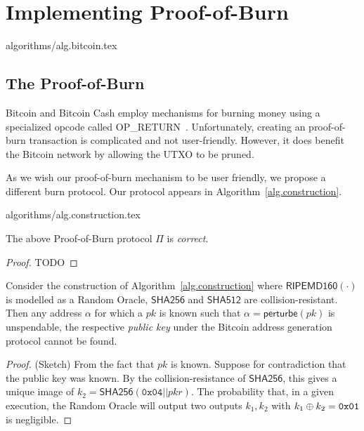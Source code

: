 \section{Implementing Proof-of-Burn}\label{section:construction}

{algorithms/alg.bitcoin.tex}


\subsection{The Proof-of-Burn}
Bitcoin and Bitcoin Cash employ mechanisms for burning money using a specialized
opcode called \textsf{OP\_RETURN}~\cite{bartoletti2017analysis}. Unfortunately,
creating an  proof-of-burn transaction is complicated and not
user-friendly. However, it does benefit the Bitcoin network by allowing the UTXO
to be pruned.

As we wish our proof-of-burn mechanism to be user friendly, we propose a
different burn protocol. Our protocol appears in
Algorithm~\ref{alg.construction}.

{algorithms/alg.construction.tex}

\begin{theorem}[Correctness]
  The above Proof-of-Burn protocol $\Pi$ is \emph{correct}.
\end{theorem}
\begin{proof}
  TODO
\end{proof}

\begin{lemma}[Unspendability]
  Consider the construction of Algorithm~\ref{alg.construction} where
  $\textsf{RIPEMD160}(\cdot)$ is modelled as a Random Oracle, $\textsf{SHA256}$
  and $\textsf{SHA512}$  are collision-resistant. Then any address $\alpha$ for
  which a $pk$ is known such that $\alpha = \textsf{perturbe}(pk)$ is
  unspendable, the respective \emph{public key} under the Bitcoin address
  generation protocol cannot be found.
\end{lemma}
\begin{proof}(Sketch)
  From the fact that $pk$ is known.
  Suppose for contradiction that the public key was known.
  By the collision-resistance of $\textsf{SHA256}$, this gives a unique image of
  $k_2 = \textsf{SHA256}(\texttt{0x04} || pkr)$.
  The probability that, in a given execution, the Random Oracle will output two
  outputs $k_1, k_2$ with $k_1 \oplus k_2 = \texttt{0x01}$ is negligible.
\end{proof}

